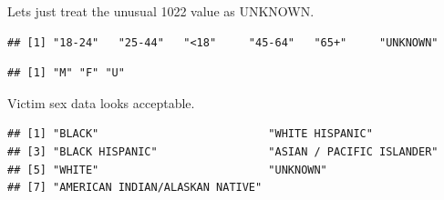 \documentclass[
]{article}
\newenvironment{Shaded}{\begin{snugshade}}{\end{snugshade}}
\newcommand{\CommentTok}[1]{\textcolor[rgb]{0.56,0.35,0.01}{\textit{#1}}}
\newcommand{\FunctionTok}[1]{\textcolor[rgb]{0.13,0.29,0.53}{\textbf{#1}}}
\newcommand{\NormalTok}[1]{#1}
\newcommand{\OtherTok}[1]{\textcolor[rgb]{0.56,0.35,0.01}{#1}}
\newcommand{\SpecialCharTok}[1]{\textcolor[rgb]{0.81,0.36,0.00}{\textbf{#1}}}
\newcommand{\StringTok}[1]{\textcolor[rgb]{0.31,0.60,0.02}{#1}}
\begin{document}
Lets just treat the unusual 1022 value as UNKNOWN.

\begin{Shaded}
\end{Shaded}

\begin{verbatim}
## [1] "18-24"   "25-44"   "<18"     "45-64"   "65+"     "UNKNOWN"
\end{verbatim}

\begin{Shaded}
\end{Shaded}

\begin{verbatim}
## [1] "M" "F" "U"
\end{verbatim}

Victim sex data looks acceptable.

\begin{Shaded}
\end{Shaded}

\begin{verbatim}
## [1] "BLACK"                          "WHITE HISPANIC"                
## [3] "BLACK HISPANIC"                 "ASIAN / PACIFIC ISLANDER"      
## [5] "WHITE"                          "UNKNOWN"                       
## [7] "AMERICAN INDIAN/ALASKAN NATIVE"
\end{verbatim}
\end{document}
